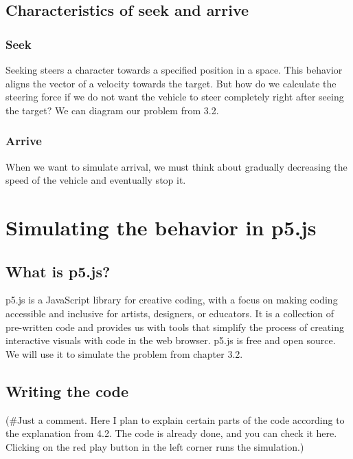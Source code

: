 \documentclass[10pt,twoside,slovak,a4paper]{article}
\begin{document}
\subsection{Characteristics of seek and arrive } \label{characterictics of seek and arrive}

\subsubsection{Seek} \label{seek}

Seeking steers a character towards a specified position in a space. This behavior aligns the vector of a velocity towards the target. But how do we calculate the steering force if we do not want the vehicle to steer completely right after seeing the target? We can diagram our problem from 3.2.

\subsubsection{Arrive} \label{arrive}

When we want to simulate arrival, we must think about gradually decreasing the speed of the vehicle and eventually stop it.

\section{Simulating the behavior in p5.js} \label{simulation} 

\subsection{What is p5.js?} \label{p5 char} 

p5.js is a JavaScript library for creative coding, with a focus on making coding accessible and inclusive for artists, designers, or educators. It is a collection of pre-written code and provides us with tools that simplify the process of creating interactive visuals with code in the web browser. p5.js is free and open source. We will use it to simulate the problem from chapter 3.2. 

\subsection{Writing the code } \label{code} 

(#Just a comment. Here I plan to explain certain parts of the code according to the explanation from 4.2. The code is already done, and you can check it here. Clicking on the red play button in the left corner runs the simulation.)
\end{document}
